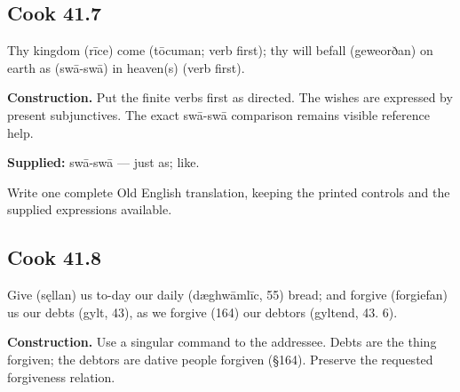 \par\begin{minipage}{\linewidth}\raggedright
\subsection*{Cook 41.7}

Thy kingdom (rīce) come (tōcuman; verb first); thy will befall (geweorðan) on earth as (swā-swā) in heaven(s) (verb first).

\textbf{Construction.} Put the finite verbs first as directed. The wishes are expressed by present subjunctives. The exact swā-swā comparison remains visible reference help.

\textbf{Supplied:} swā-swā — just as; like.

Write one complete Old English translation, keeping the printed controls and the supplied expressions available.

\end{minipage}\par\addvspace{4pt}

\par\begin{minipage}{\linewidth}\raggedright
\subsection*{Cook 41.8}

Give (sęllan) us to-day our daily (dæghwāmlīc, 55) bread; and forgive (forgiefan) us our debts (gylt, 43), as we forgive (164) our debtors (gyltend, 43. 6).

\textbf{Construction.} Use a singular command to the addressee. Debts are the thing forgiven; the debtors are dative people forgiven (§164). Preserve the requested forgiveness relation.

\end{minipage}\par\addvspace{4pt}

